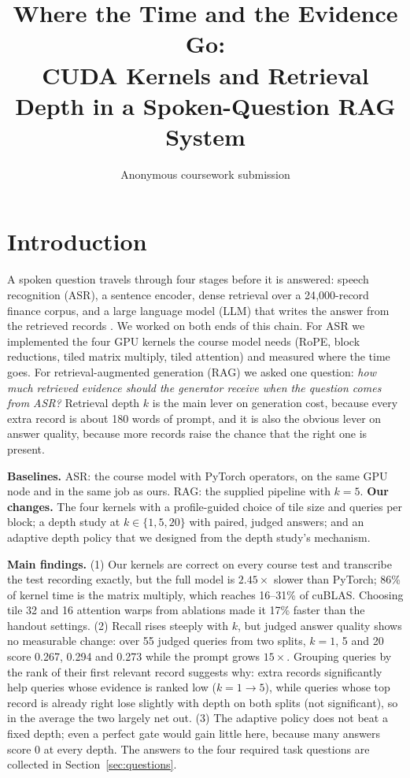 \documentclass{article}
\title{Where the Time and the Evidence Go:\\CUDA Kernels and Retrieval Depth in a Spoken-Question RAG System}
\author{Anonymous coursework submission}
\begin{document}
\maketitle


\section{Introduction}
\label{sec:introduction}

A spoken question travels through four stages before it is answered: speech recognition (ASR), a sentence encoder, dense retrieval over a 24{,}000-record finance corpus, and a large language model (LLM) that writes the answer from the retrieved records \citep{lewis2020rag}. We worked on both ends of this chain. For ASR we implemented the four GPU kernels the course model needs (RoPE, block reductions, tiled matrix multiply, tiled attention) and measured where the time goes. For retrieval-augmented generation (RAG) we asked one question: \emph{how much retrieved evidence should the generator receive when the question comes from ASR?} Retrieval depth $k$ is the main lever on generation cost, because every extra record is about 180 words of prompt, and it is also the obvious lever on answer quality, because more records raise the chance that the right one is present.

\textbf{Baselines.} ASR: the course model with PyTorch operators, on the same GPU node and in the same job as ours. RAG: the supplied pipeline with $k=5$.
\textbf{Our changes.} The four kernels with a profile-guided choice of tile size and queries per block; a depth study at $k\in\{1,5,20\}$ with paired, judged answers; and an adaptive depth policy that we designed from the depth study's mechanism.

\textbf{Main findings.} (1) Our kernels are correct on every course test and transcribe the test recording exactly, but the full model is $2.45\times$ slower than PyTorch; 86\% of kernel time is the matrix multiply, which reaches 16--31\% of cuBLAS. Choosing tile 32 and 16 attention warps from ablations made it 17\% faster than the handout settings. (2) Recall rises steeply with $k$, but judged answer quality shows no measurable change: over 55 judged queries from two splits, $k=1$, 5 and 20 score 0.267, 0.294 and 0.273 while the prompt grows $15\times$. Grouping queries by the rank of their first relevant record suggests why: extra records significantly help queries whose evidence is ranked low ($k=1\to5$), while queries whose top record is already right lose slightly with depth on both splits (not significant), so in the average the two largely net out. (3) The adaptive policy does not beat a fixed depth; even a perfect gate would gain little here, because many answers score 0 at every depth. The answers to the four required task questions are collected in Section~\ref{sec:questions}.
\end{document}
